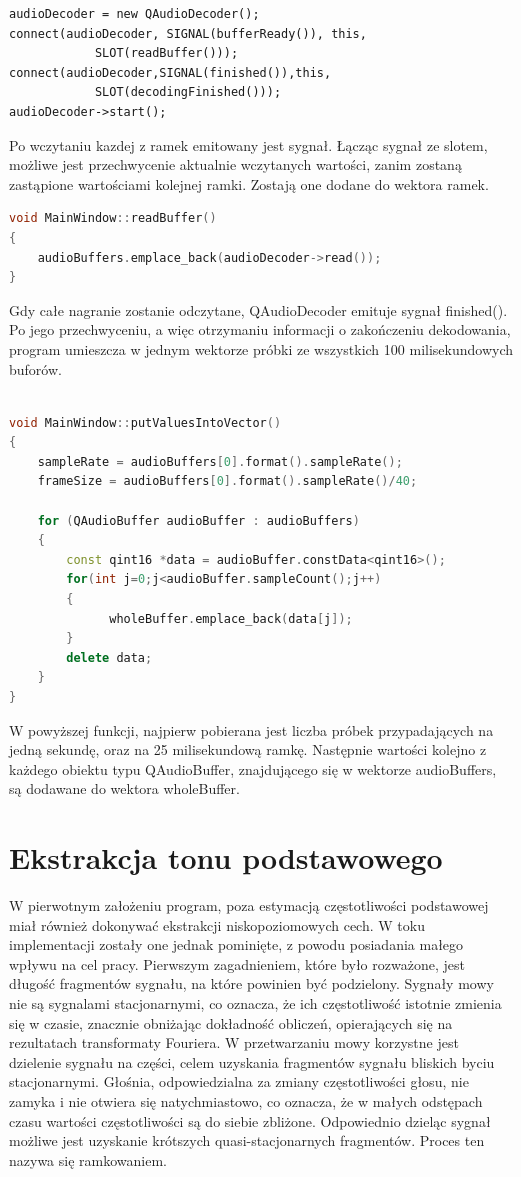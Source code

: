 \documentclass[a4paper,12 pt]{report}
\begin{document}
\begin{lstlisting}
audioDecoder = new QAudioDecoder();
connect(audioDecoder, SIGNAL(bufferReady()), this, 
			SLOT(readBuffer()));
connect(audioDecoder,SIGNAL(finished()),this,
			SLOT(decodingFinished()));
audioDecoder->start();
\end{lstlisting}
Po wczytaniu kazdej z ramek emitowany jest sygnał. Łącząc sygnał ze slotem, możliwe jest przechwycenie aktualnie wczytanych wartości, zanim zostaną zastąpione wartościami kolejnej ramki.
Zostają one dodane do wektora ramek.
\begin{lstlisting}[caption={Funkcja przechwytująca wczytany fragment},label={lst:label},language=C++]
void MainWindow::readBuffer()
{
    audioBuffers.emplace_back(audioDecoder->read());
}
\end{lstlisting}
Gdy całe nagranie zostanie odczytane, QAudioDecoder emituje sygnał finished(). Po jego przechwyceniu, a więc otrzymaniu informacji o zakończeniu dekodowania, program umieszcza w jednym wektorze próbki ze wszystkich 100 milisekundowych buforów.

\begin{lstlisting}[caption={Funkcja dodająca do wektora wszystkie odczytane próbki},label={lst:label},language=C++]

void MainWindow::putValuesIntoVector()
{
    sampleRate = audioBuffers[0].format().sampleRate();
    frameSize = audioBuffers[0].format().sampleRate()/40;
    
    for (QAudioBuffer audioBuffer : audioBuffers)
    {
        const qint16 *data = audioBuffer.constData<qint16>();
        for(int j=0;j<audioBuffer.sampleCount();j++)
        {
              wholeBuffer.emplace_back(data[j]);
        }
        delete data;
    }
}
\end{lstlisting}
W powyższej funkcji, najpierw pobierana jest liczba próbek przypadających na jedną sekundę, oraz na 25 milisekundową ramkę. Następnie wartości kolejno z każdego obiektu typu QAudioBuffer, znajdującego się w wektorze audioBuffers, są dodawane do wektora wholeBuffer.

\section{Ekstrakcja tonu podstawowego}
W pierwotnym założeniu program, poza estymacją częstotliwości podstawowej miał również dokonywać ekstrakcji niskopoziomowych cech.
W toku implementacji zostały one jednak pominięte, z powodu posiadania małego wpływu na cel pracy. 
Pierwszym zagadnieniem, które było rozważone, jest długość fragmentów sygnału, na które powinien być podzielony.
Sygnały mowy nie są sygnalami stacjonarnymi, co oznacza, że ich częstotliwość istotnie zmienia się w czasie, znacznie obniżając dokładność obliczeń, opierających się na rezultatach transformaty Fouriera.
W przetwarzaniu mowy korzystne jest dzielenie sygnału na części, celem uzyskania fragmentów sygnału bliskich byciu stacjonarnymi.
Głośnia, odpowiedzialna za zmiany częstotliwości głosu, nie zamyka i nie otwiera się natychmiastowo, co oznacza, że w małych odstępach czasu wartości częstotliwości są do siebie zbliżone.
Odpowiednio dzieląc sygnał możliwe jest uzyskanie krótszych  quasi-stacjonarnych fragmentów. Proces ten nazywa się ramkowaniem.
\end{document}
